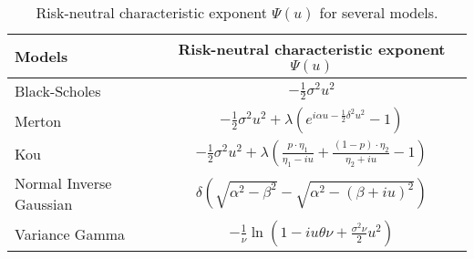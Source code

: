 \begin{table}[!ht]
\centering
  \begin{tabular}{l|c}
    \toprule
    Models & Risk-neutral characteristic exponent $\Psi(u)$ \\
    \toprule
   Black-Scholes & $-\frac{1}{2}\sigma^2u^2$ \\
   \midrule
   Merton & $-\frac{1}{2}\sigma^2 u^2 + \lambda\left(e^{i\alpha u -\frac{1}{2}\delta^2 u^2}-1\right)$\\
   Kou & $-\frac{1}{2}\sigma^2 u^2 +\lambda\left(\frac{p\cdot\eta_1}{\eta_1-iu}+\frac{(1-p)\cdot\eta_2}{\eta_2+iu}-1\right)$\\
   \midrule
   Normal Inverse Gaussian & $\delta \left(\sqrt{\alpha^2-\beta^2}-\sqrt{\alpha^2-(\beta+iu)^2}\right)$\\
   Variance Gamma &$-\frac{1}{\nu}\ln\left(1-iu\theta\nu+\frac{\sigma^2\nu}{2}u^2\right)$ \\
    \bottomrule
  \end{tabular}
  \caption{\label{tab:rn_ce} Risk-neutral characteristic exponent $\Psi(u)$ for several models.}
\end{table}
